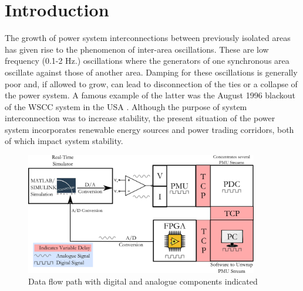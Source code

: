 \documentclass[conference]{IEEEtran}
\begin{document}




%
\IEEEpeerreviewmaketitle

\section{Introduction}
The growth of power system interconnections between previously isolated areas has given rise to the phenomenon of inter-area oscillations. These are low frequency (0.1-2 Hz.) oscillations where the generators of one synchronous area oscillate against those of another area. Damping for these oscillations is generally poor and, if allowed to grow, can lead to disconnection of the ties or a collapse of the power system. A famous example of the latter was the August 1996 blackout of the WSCC system in the USA \cite{NAERC}. Although the purpose of system interconnection was to increase stability, the present situation of the power system incorporates renewable energy sources and power trading corridors, both of which impact system stability.

\begin{figure}[htb]
\centering
\includegraphics[width=4in]{DataFlow.png}
\caption{Data flow path with digital and analogue components indicated}
\label{Data_path}
\end{figure}
\end{document}
